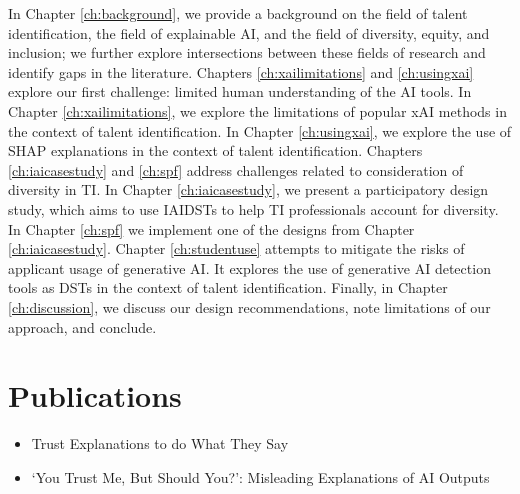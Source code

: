 In Chapter \ref{ch:background}, we provide a background on the field of talent identification, the field of explainable AI, and the field of diversity, equity, and inclusion; we further explore intersections between these fields of research and identify gaps in the literature. Chapters \ref{ch:xailimitations} and \ref{ch:usingxai} explore our first challenge: limited human understanding of the AI tools. In Chapter \ref{ch:xailimitations}, we explore the limitations of popular xAI methods in the context of talent identification. In Chapter \ref{ch:usingxai}, we explore the use of SHAP explanations in the context of talent identification. Chapters \ref{ch:iaicasestudy} and \ref{ch:spf}  address challenges related to consideration of diversity in TI. In Chapter \ref{ch:iaicasestudy}, we present a participatory design study, which aims to use IAIDSTs to help TI professionals account for diversity. In Chapter \ref{ch:spf} we implement one of the designs from Chapter \ref{ch:iaicasestudy}. Chapter \ref{ch:studentuse} attempts to mitigate the risks of applicant usage of generative AI. It explores the use of generative AI detection tools as DSTs in the context of talent identification. Finally, in Chapter \ref{ch:discussion}, we discuss our design recommendations, note limitations of our approach, and conclude.

\section{Publications}

\begin{itemize}
    \item \textcite{natarajan_trust_2023} Trust Explanations to do What They Say
    \item \textcite{...} `You Trust Me, But Should You?': Misleading Explanations of AI Outputs
\end{itemize}